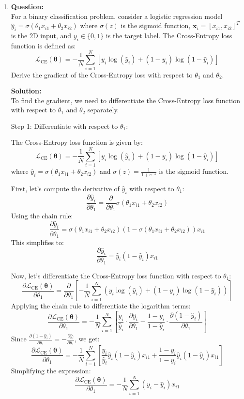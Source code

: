 \documentclass{article}
\begin{document}
\begin{enumerate}
\item \textbf{Question:} \\
For a binary classification problem, consider a logistic regression model \( \hat{y}_i = \sigma(\theta_1 x_{i1} + \theta_2 x_{i2}) \) where \(\sigma(z)\) is the sigmoid function, \(\mathbf{x}_i = [x_{i1}, x_{i2}]^T\) is the 2D input, and \(y_i \in \{0, 1\}\) is the target label. The Cross-Entropy loss function is defined as:
\[
\mathcal{L}_{\text{CE}}(\mathbf{\theta}) = -\frac{1}{N} \sum_{i=1}^{N} \left[ y_i \log(\hat{y}_i) + (1 - y_i) \log(1 - \hat{y}_i) \right]
\]
Derive the gradient of the Cross-Entropy loss with respect to \(\theta_1\) and \(\theta_2\).

\textbf{Solution:}\\
To find the gradient, we need to differentiate the Cross-Entropy loss function with respect to \(\theta_1\) and \(\theta_2\) separately.

Step 1: Differentiate with respect to \(\theta_1\):

The Cross-Entropy loss function is given by:
\[
\mathcal{L}_{\text{CE}}(\mathbf{\theta}) = -\frac{1}{N} \sum_{i=1}^{N} \left[ y_i \log(\hat{y}_i) + (1 - y_i) \log(1 - \hat{y}_i) \right]
\]
where \( \hat{y}_i = \sigma(\theta_1 x_{i1} + \theta_2 x_{i2}) \) and \( \sigma(z) = \frac{1}{1 + e^{-z}} \) is the sigmoid function.

First, let's compute the derivative of \( \hat{y}_i \) with respect to \( \theta_1 \):
\[
\frac{\partial \hat{y}_i}{\partial \theta_1} = \frac{\partial}{\partial \theta_1} \sigma(\theta_1 x_{i1} + \theta_2 x_{i2})
\]
Using the chain rule:
\[
\frac{\partial \hat{y}_i}{\partial \theta_1} = \sigma(\theta_1 x_{i1} + \theta_2 x_{i2}) \left( 1 - \sigma(\theta_1 x_{i1} + \theta_2 x_{i2}) \right) x_{i1}
\]
This simplifies to:
\[
\frac{\partial \hat{y}_i}{\partial \theta_1} = \hat{y}_i (1 - \hat{y}_i) x_{i1}
\]

Now, let's differentiate the Cross-Entropy loss function with respect to \( \theta_1 \):
\[
\frac{\partial \mathcal{L}_{\text{CE}}(\mathbf{\theta})}{\partial \theta_1} = \frac{\partial}{\partial \theta_1} \left[ -\frac{1}{N} \sum_{i=1}^{N} \left( y_i \log(\hat{y}_i) + (1 - y_i) \log(1 - \hat{y}_i) \right) \right]
\]
Applying the chain rule to differentiate the logarithm terms:
\[
\frac{\partial \mathcal{L}_{\text{CE}}(\mathbf{\theta})}{\partial \theta_1} = -\frac{1}{N} \sum_{i=1}^{N} \left[ \frac{y_i}{\hat{y}_i} \cdot \frac{\partial \hat{y}_i}{\partial \theta_1} - \frac{1 - y_i}{1 - \hat{y}_i} \cdot \frac{\partial (1 - \hat{y}_i)}{\partial \theta_1} \right]
\]
Since \( \frac{\partial (1 - \hat{y}_i)}{\partial \theta_1} = -\frac{\partial \hat{y}_i}{\partial \theta_1} \), we get:
\[
\frac{\partial \mathcal{L}_{\text{CE}}(\mathbf{\theta})}{\partial \theta_1} = -\frac{1}{N} \sum_{i=1}^{N} \left[ \frac{y_i}{\hat{y}_i} \hat{y}_i (1 - \hat{y}_i) x_{i1} + \frac{1 - y_i}{1 - \hat{y}_i} \hat{y}_i (1 - \hat{y}_i) x_{i1} \right]
\]
Simplifying the expression:
\[
\frac{\partial \mathcal{L}_{\text{CE}}(\mathbf{\theta})}{\partial \theta_1} = -\frac{1}{N} \sum_{i=1}^{N} \left( y_i - \hat{y}_i \right) x_{i1}
\]


\end{enumerate}
\end{document}
